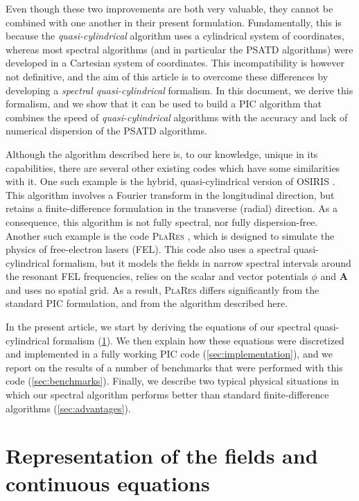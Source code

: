 \documentclass[1p,times]{elsarticle}
\renewcommand{\vec}[1]{\boldsymbol{#1}}
\begin{document}
Even though these two improvements are both very valuable, they cannot be
combined with one another in their present
formulation. Fundamentally, this is because the \emph{quasi-cylindrical} algorithm uses a
cylindrical system of coordinates, whereas most spectral algorithms
(and in particular the PSATD algorithms)
were developed in a Cartesian system of coordinates. This
incompatibility is however not definitive, and the aim of this article
is to overcome these differences by developing a \emph{spectral
  quasi-cylindrical} formalism. In this document, we derive this formalism,
and we show that it can be used to build a PIC algorithm that combines 
the speed of \emph{quasi-cylindrical} algorithms with
the accuracy and lack of numerical dispersion of the PSATD algorithms.

Although the algorithm described here is, to our knowledge, unique in
its capabilities, there are several other existing codes
  which have some similarities with it. One such example is the
hybrid, quasi-cylindrical version of \textsc{OSIRIS} \citep{Yuarxiv2015}. This algorithm
involves a Fourier transform in the longitudinal direction, but
retains a finite-difference formulation in the transverse (radial)
direction. As a consequence, this algorithm is not fully spectral, nor
fully dispersion-free. Another such example is the code \textsc{PlaRes} 
\citep{AndriyashJCP2015}, which is designed to simulate the physics of
free-electron lasers (FEL). This code also uses a spectral quasi-cylindrical
formalism, but it models the fields in narrow spectral intervals around the
resonant FEL frequencies, relies on the scalar and vector potentials
$\phi$ and $\vec{A}$ and uses no spatial grid. As a result,
\textsc{PlaRes} differs significantly from the standard PIC
formulation, and from the algorithm described here.

In the present article, we start by deriving the equations of our
spectral quasi-cylindrical formalism (\cref{sec:theory}). We then explain
how these equations were discretized and implemented in a fully
working PIC code (\cref{sec:implementation}), and we report on the
results of a number of benchmarks that were performed with this code 
(\cref{sec:benchmarks}). Finally, we describe two typical physical situations in
which our spectral algorithm performs better than standard 
finite-difference algorithms (\cref{sec:advantages}).

\section{Representation of the fields and continuous equations}
\label{sec:theory}
\end{document}
